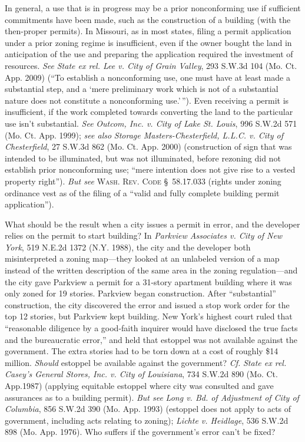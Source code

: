 In general, a use that is in progress may be a prior nonconforming use if
sufficient commitments have been made, such as the construction of a building
(with the then-proper permits). In Missouri, as in most states, filing a permit
application under a prior zoning regime is insufficient, even if the owner
bought the land in anticipation of the use and preparing the application
required the investment of resources. \textit{See} \emph{State ex rel. Lee v.
City of Grain Valley}, 293 S.W.3d 104 (Mo. Ct. App. 2009) (``To establish a
nonconforming use, one must have at least made a substantial step, and a `mere
preliminary work which is not of a substantial nature does not constitute a
nonconforming use.'\,''). Even receiving a permit is insufficient, if the work
completed towards converting the land to the particular use isn't substantial.
\textit{See} \emph{Outcom, Inc. v. City of Lake St. Louis}, 996 S.W.2d 571 (Mo.
Ct. App. 1999); \textit{see also} \emph{Storage Masters-Chesterfield, L.L.C. v.
City of Chesterfield}, 27 S.W.3d 862 (Mo. Ct. App. 2000) (construction of sign
that was intended to be illuminated, but was not illuminated, before rezoning
did not establish prior nonconforming use; ``mere intention does not give rise
to a vested property right''). \textit{But see} \textsc{Wash. Rev. Code
\S~58.17.033} (rights under zoning ordinance vest as of the filing of a ``valid
and fully complete building permit application'').

What should be the result when a city issues a permit in error, and the
developer relies on the permit to start building? In \textit{Parkview Associates
v. City of New York}, 519 N.E.2d 1372 (N.Y. 1988), the city and the developer
both misinterpreted a zoning map---they looked at an unlabeled version of a map
instead of the written description of the same area in the zoning
regulation---and the city gave Parkview a permit for a 31-story apartment
building where it was only zoned for 19 stories. Parkview began construction.
After ``substantial'' construction, the city discovered the error and issued a
stop work order for the top 12 stories, but Parkview kept building. New York's
highest court ruled that ``reasonable diligence by a good-faith inquirer would
have disclosed the true facts and the bureaucratic error,'' and held that
estoppel was not available against the government. The extra stories had to be
torn down at a cost of roughly \$14 million. \textit{Should} estoppel be
available against the government? \textit{Cf.} \emph{State ex rel. Casey's
General Stores, Inc. v. City of Louisiana}, 734 S.W.2d 890 (Mo. Ct. App.1987)
(applying equitable estoppel where city was consulted and gave assurances as to
a building permit). \textit{But see} \emph{Long v. Bd. of Adjustment of City of
Columbia}, 856 S.W.2d 390 (Mo. App. 1993) (estoppel does not apply to acts of
government, including acts relating to zoning); \emph{Lichte v. Heidlage}, 536
S.W.2d 898 (Mo. App. 1976). Who suffers if the government's error can't be
fixed?

